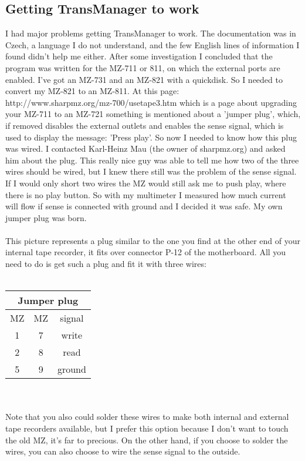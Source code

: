 \subsection{Getting TransManager to work}
I had major problems getting TransManager to work. The documentation was in 
Czech, a language I do not understand, and the few English lines of information
I found didn't help me either. After some investigation I concluded that the
program was written for the MZ-711 or 811, on which the external ports are 
enabled. I've got an MZ-731 and an MZ-821 with a quickdisk. So I needed to 
convert my MZ-821 to an MZ-811. At this page: \\
http://www.sharpmz.org/mz-700/usetape3.htm which is a page about upgrading 
your MZ-711 to an MZ-721 something is mentioned about a 'jumper plug', which,
if removed disables the external outlets and enables the sense signal, which
is used to display the message: 'Press play'. So now I needed to know how
this plug was wired. I contacted Karl-Heinz Mau \cite{MZ} (the owner of 
sharpmz.org)
and asked him about the plug. This really nice guy was able to tell me how 
two of the three wires should be wired, but I knew there still was the problem
of the sense signal. If I would only short two wires the MZ would still ask
me to push play, where there is no play button. So with my multimeter I
measured how much current will flow if sense is connected with ground and I
decided it was safe. My own jumper plug was born. \\
 \\
This picture represents a plug similar to the one you find at the other end
of your internal tape recorder, it fits over connector P-12 of the motherboard.
All you need to do is get such a plug and fit it with three wires: \\ \\
\begin{tabular}{c|c|c}
\multicolumn{3}{c}{Jumper plug} \\
\hline
MZ & MZ & signal \\
\hline
1 & 7 & write \\
2 & 8 & read \\
5 & 9 & ground \\
\end{tabular} \\ \\
Note that you also could solder these wires to make both internal and external
tape recorders available, but I prefer this option because I don't want to 
touch the old MZ, it's far to precious. On the other hand, if you choose to
solder the wires, you can also choose to wire the sense signal to the outside.

